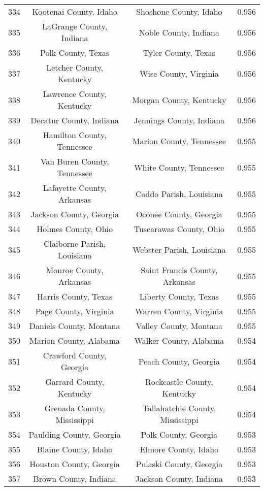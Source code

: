 \begin{longtable}{cccc}
  334 & Kootenai County, Idaho & Shoshone County, Idaho & 0.956 \\ 
  335 & LaGrange County, Indiana & Noble County, Indiana & 0.956 \\ 
  336 & Polk County, Texas & Tyler County, Texas & 0.956 \\ 
  337 & Letcher County, Kentucky & Wise County, Virginia & 0.956 \\ 
  338 & Lawrence County, Kentucky & Morgan County, Kentucky & 0.956 \\ 
  339 & Decatur County, Indiana & Jennings County, Indiana & 0.956 \\ 
  340 & Hamilton County, Tennessee & Marion County, Tennessee & 0.955 \\ 
  341 & Van Buren County, Tennessee & White County, Tennessee & 0.955 \\ 
  342 & Lafayette County, Arkansas & Caddo Parish, Louisiana & 0.955 \\ 
  343 & Jackson County, Georgia & Oconee County, Georgia & 0.955 \\ 
  344 & Holmes County, Ohio & Tuscarawas County, Ohio & 0.955 \\ 
  345 & Claiborne Parish, Louisiana & Webster Parish, Louisiana & 0.955 \\ 
  346 & Monroe County, Arkansas & Saint Francis County, Arkansas & 0.955 \\ 
  347 & Harris County, Texas & Liberty County, Texas & 0.955 \\ 
  348 & Page County, Virginia & Warren County, Virginia & 0.955 \\ 
  349 & Daniels County, Montana & Valley County, Montana & 0.955 \\ 
  350 & Marion County, Alabama & Walker County, Alabama & 0.954 \\ 
  351 & Crawford County, Georgia & Peach County, Georgia & 0.954 \\ 
  352 & Garrard County, Kentucky & Rockcastle County, Kentucky & 0.954 \\ 
  353 & Grenada County, Mississippi & Tallahatchie County, Mississippi & 0.954 \\ 
  354 & Paulding County, Georgia & Polk County, Georgia & 0.953 \\ 
  355 & Blaine County, Idaho & Elmore County, Idaho & 0.953 \\ 
  356 & Houston County, Georgia & Pulaski County, Georgia & 0.953 \\ 
  357 & Brown County, Indiana & Jackson County, Indiana & 0.953 \\ 

\end{longtable}
